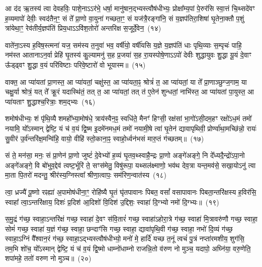 {\anuvakamend[{भव॑त॒मेक॑त्रिꣳशच्च}]}%

आ द॑द ऋ॒तस्य॑ त्वा देवहविः॒ पाशे॒ना\-ऽऽ\-र॑भे॒ धर्\mbox{}षा॒ मानु॑षान॒द्भ्यस्त्वौष॑धीभ्यः॒ प्रोक्षा᳚म्य॒पां पे॒रुर॑सि स्वा॒त्तं चि॒थ्सदे॑वꣳ ह॒व्यमापो॑ देवीः॒ स्वद॑तैन॒ꣳ॒ सं ते᳚ प्रा॒णो वा॒युना॑ गच्छता॒ꣳ॒ सं यज॑त्रै॒रङ्गा॑नि॒ सं य॒ज्ञप॑तिरा॒शिषा॑ घृ॒तेना॒क्तौ प॒शुं त्रा॑येथा॒ꣳ॒ रेव॑तीर्य॒ज्ञप॑तिं प्रिय॒धा\-ऽऽ\-वि॑श॒तोरो॑ अन्तरिक्ष स॒जूर्दे॒वेन॒~(१४)

वाते॑ना॒\-ऽस्य ह॒विष॒स्त्मना॑ यज॒ सम॑स्य त॒नुवा॑ भव॒ वर्\mbox{}षी॑यो॒ वर्\mbox{}षी॑यसि य॒ज्ञे य॒ज्ञप॑तिं धाः पृथि॒व्याः स॒म्पृचः॑ पाहि॒ नम॑स्त आताना\-ऽन॒र्वा प्रेहि॑ घृ॒तस्य॑ कु॒ल्यामनु॑ स॒ह प्र॒जया॑ स॒ह रा॒यस्पोषे॒णा\-ऽऽ\-पो॑ देवीः शुद्धायुवः शु॒द्धा यू॒यं दे॒वाꣳ ऊ᳚ड्ढ्वꣳ शु॒द्धा व॒यं परि॑विष्टाः परिवे॒ष्टारो॑ वो भूयास्म॥~(१५)

{\anuvakamend[{दे॒वेन॒ चतु॑श्चत्वारिꣳशच्च}]}%

वाक्त॒ आ प्या॑यतां प्रा॒णस्त॒ आ प्या॑यतां॒ चक्षु॑स्त॒ आ प्या॑यता॒ꣴ॒ श्रोत्रं॑ त॒ आ प्या॑यतां॒ या ते᳚ प्रा॒णाञ्छुग्ज॒गाम॒ या चक्षु॒र्या श्रोत्रं॒ यत् ते᳚ क्रू॒रं यदास्थि॑तं॒ तत् त॒ आ प्या॑यतां॒ तत् त॑ ए॒तेन॑ शुन्धतां॒ नाभि॑स्त॒ आ प्या॑यतां पा॒युस्त॒ आ प्या॑यताꣳ शु॒द्धाश्च॒रित्राः॒ शम॒द्भ्यः~(१६)

शमोष॑धीभ्यः॒ शं पृ॑थि॒व्यै शमहो᳚भ्या॒मोष॑धे॒ त्राय॑स्वैन॒ꣴ॒ स्वधि॑ते॒ मैनꣳ॑ हिꣳसी॒ रक्ष॑सां भा॒गो॑\-ऽसी॒दम॒हꣳ रक्षो॑\-ऽध॒मं तमो॑ नयामि॒ यो᳚\-ऽस्मान् द्वेष्टि॒ यं च॑ व॒यं द्वि॒ष्म इ॒दमे॑नमध॒मं तमो॑ नयामी॒षे त्वा॑ घृ॒तेन॑ द्यावा\-पृथिवी॒ प्रोर्ण्वा॑था॒मच्छि॑न्नो॒ रायः॑ सु॒वीर॑ उ॒र्व॑न्तरि॑क्ष॒मन्वि॑हि॒ वायो॒ वीहि॑ स्तो॒काना॒ꣴ॒ स्वाहो॒र्ध्वन॑भसं मारु॒तं ग॑च्छतम्॥~(१७)

{\anuvakamend[{अ॒द्भ्यो वीहि॒ पञ्च॑ च}]}%

सं ते॒ मन॑सा॒ मनः॒ सं प्रा॒णेन॑ प्रा॒णो जुष्टं॑ दे॒वेभ्यो॑ ह॒व्यं घृ॒तव॒थ्\-स्वाहै॒न्द्रः प्रा॒णो अङ्गे॑अङ्गे॒ नि दे᳚ध्यदै॒न्द्रो॑\-ऽपा॒नो अङ्गे॑अङ्गे॒ वि बो॑भुव॒द्देव॑ त्वष्ट॒र्भूरि॑ ते॒ सꣳस॑मेतु॒ विषु॑रूपा॒ यथ्सल॑क्ष्माणो॒ भव॑थ देव॒त्रा यन्त॒मव॑से॒ सखा॒यो\-ऽनु॑ त्वा मा॒ता पि॒तरो॑ मदन्तु॒ श्रीर॑स्य॒ग्निस्त्वा᳚ श्रीणा॒त्वापः॒ सम॑रिण॒न्वात॑स्य~(१८)

त्वा॒ ध्रज्यै॑ पू॒ष्णो रꣴह्या॑ अ॒पामोष॑धीना॒ꣳ॒ रोहि॑ष्यै घृ॒तं घृ॑तपावानः पिबत॒ वसां᳚ वसापावानः पिबता॒न्त\-रि॑क्षस्य ह॒विर॑सि॒ स्वाहा᳚ त्वा॒\-ऽन्तरि॑क्षाय॒ दिशः॑ प्र॒दिश॑ आ॒दिशो॑ वि॒दिश॑ उ॒द्दिशः॒ स्वाहा॑ दि॒ग्भ्यो नमो॑ दि॒ग्भ्यः॥~(१९)

{\anuvakamend[{वात॑स्या॒ष्टाविꣳ॑शतिश्च}]}%

स॒मु॒द्रं ग॑च्छ॒ स्वाहा॒\-ऽन्तरि॑क्षं गच्छ॒ स्वाहा॑ दे॒वꣳ स॑वि॒तारं॑ गच्छ॒ स्वाहा॑\-ऽहोरा॒त्रे ग॑च्छ॒ स्वाहा॑ मि॒त्रावरु॑णौ गच्छ॒ स्वाहा॒ सोमं॑ गच्छ॒ स्वाहा॑ य॒ज्ञं ग॑च्छ॒ स्वाहा॒ छन्दाꣳ॑सि गच्छ॒ स्वाहा॒ द्यावा॑\-पृथि॒वी ग॑च्छ॒ स्वाहा॒ नभो॑ दि॒व्यं ग॑च्छ॒ स्वाहा॒\-ऽग्निं वै᳚श्वान॒रं ग॑च्छ॒ स्वाहा॒\-ऽद्भ्यस्त्वौष॑धीभ्यो॒ मनो॑ मे॒ हार्दि॑ यच्छ त॒नूं त्वचं॑ पु॒त्रं नप्ता॑रमशीय॒ शुग॑सि॒ तम॒भि शो॑च॒ यो᳚\-ऽस्मान् द्वेष्टि॒ यं च॑ व॒यं द्वि॒ष्मो धाम्नो॑धाम्नो राजन्नि॒तो व॑रुण नो मुञ्च॒ यदापो॒ अघ्नि॑या॒ वरु॒णेति॒ शपा॑महे॒ ततो॑ वरुण नो मुञ्च॥~(२०)

